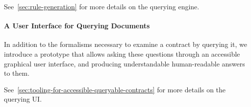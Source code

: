 See~\autoref{sec:rule-generation} for more details on the querying engine.

\paragraph{A User Interface for Querying Documents} In addition to the formalisms necessary to examine a contract by querying it, we introduce a prototype that allows asking these questions through an accessible graphical user interface, and producing understandable human-readable answers to them.

See~\autoref{sec:tooling-for-accessible-queryable-contracts} for more details on the querying UI\@.

